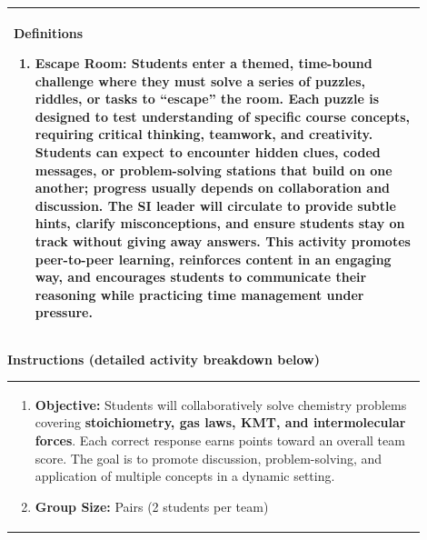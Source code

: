 \documentclass{article}
\begin{document}
{{\vspace{0.5cm}
\noindent
\begin{tabular}{|p{0.9\linewidth}|}
\hline
{\large\textbf{Definitions}}
\begin{enumerate}
    \item \textbf{Escape Room:} Students enter a themed, time-bound challenge where they must solve a series of puzzles, riddles, or tasks to “escape” the room. Each puzzle is designed to test understanding of specific course concepts, requiring critical thinking, teamwork, and creativity. Students can expect to encounter hidden clues, coded messages, or problem-solving stations that build on one another; progress usually depends on collaboration and discussion. The SI leader will circulate to provide subtle hints, clarify misconceptions, and ensure students stay on track without giving away answers. This activity promotes peer-to-peer learning, reinforces content in an engaging way, and encourages students to communicate their reasoning while practicing time management under pressure.
\end{enumerate} \\
\hline
\end{tabular}
\newpage

\vspace{0.5cm}
\noindent
{\large \textbf{Instructions (detailed activity breakdown below)}} \\

\begin{tabular}{|p{0.9\linewidth}|}
\hline
\begin{enumerate}
    \item \textbf{Objective:} Students will collaboratively solve chemistry problems covering \textbf{stoichiometry, gas laws, KMT, and intermolecular forces}. Each correct response earns points toward an overall team score. The goal is to promote discussion, problem-solving, and application of multiple concepts in a dynamic setting.

    \item \textbf{Group Size:} Pairs (2 students per team)


\end{enumerate}
\end{tabular}}}
\end{document}
